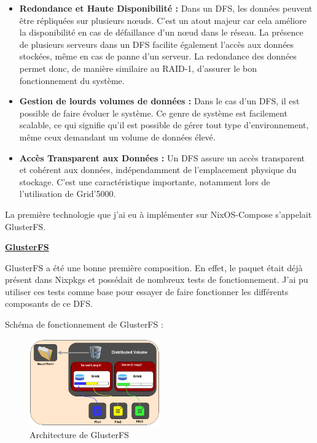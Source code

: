 \documentclass[a4paper,french,12pt, titlepage]{article}
\begin{document}
\begin{itemize}
\item
  \textbf{Redondance et Haute Disponibilité :} Dans un DFS, les données
  peuvent être répliquées sur plusieurs nœuds. C'est un atout majeur car
  cela améliore la disponibilité en cas de défaillance d'un nœud dans le
  réseau. La présence de plusieurs serveurs dans un DFS facilite
  également l'accès aux données stockées, même en cas de panne d'un
  serveur. La redondance des données permet donc, de manière similaire
  au RAID-1, d'assurer le bon fonctionnement du système.
\item
  \textbf{Gestion de lourds volumes de données :} Dans le cas d'un DFS,
  il est possible de faire évoluer le système. Ce genre de système est
  facilement scalable, ce qui signifie qu'il est possible de gérer tout
  type d'environnement, même ceux demandant un volume de données élevé.
\item
  \textbf{Accès Transparent aux Données :} Un DFS assure un accès
  transparent et cohérent aux données, indépendamment de l'emplacement
  physique du stockage. C'est une caractéristique importante, notamment
  lors de l'utilisation de Grid'5000.\newline
\end{itemize}

La première technologie que j'ai eu à implémenter sur NixOS-Compose
s'appelait GlusterFS.\newline

\textbf{\href{https://www.gluster.org/}{GlusterFS} \cite{glusterfs2012}}

GlusterFS a été une bonne première composition. En effet, le paquet
était déjà présent dans Nixpkgs et possédait de nombreux tests de
fonctionnement. J'ai pu utiliser ces tests comme base pour essayer de
faire fonctionner les différents composants de ce DFS.\newline

Schéma de fonctionnement de GlusterFS :

\begin{figure}[h]
\centering
\includegraphics[width=0.5\textwidth,height=0.5\textheight,keepaspectratio]{images/shema-gluster.png}
\caption{Architecture de GlusterFS}
\end{figure}
\end{document}
